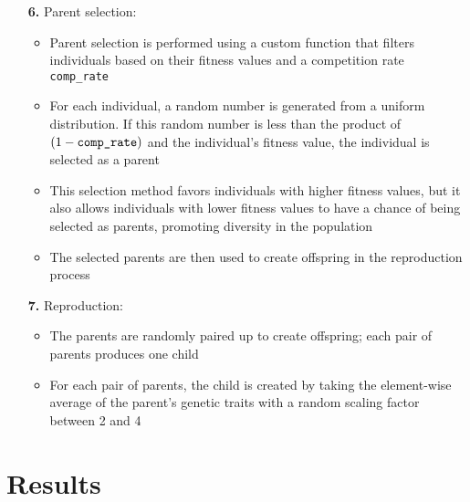 \documentclass{article}
\begin{document}
\begin{itemize}
    \item[\textbf{6.}] Parent selection:
        \begin{itemize}
            \item Parent selection is performed using a custom function that filters individuals based on their fitness values and a competition rate \verb|comp_rate|
            \item For each individual, a random number is generated from a uniform distribution. If this random number is less than the product of $(1 - \verb|comp_rate|)$ and the individual's fitness value, the individual is selected as a parent
            \item This selection method favors individuals with higher fitness values, but it also allows individuals with lower fitness values to have a chance of being selected as parents, promoting diversity in the population
            \item The selected parents are then used to create offspring in the reproduction process
        \end{itemize}
    \item[\textbf{7.}] Reproduction:
        \begin{itemize}
            \item The parents are randomly paired up to create offspring; each pair of parents produces one child
            \item For each pair of parents, the child is created by taking the element-wise average of the parent's genetic traits with a random scaling factor between 2 and 4
        \end{itemize}

\end{itemize}

\section{Results}
\end{document}
